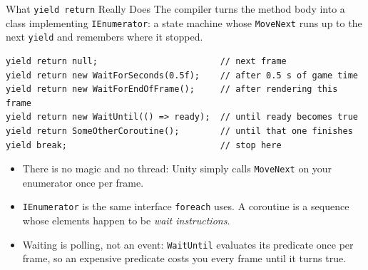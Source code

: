 \begin{frame}[fragile]{What \texttt{yield return} Really Does}
  The compiler turns the method body into a class implementing
  \texttt{IEnumerator}: a state machine whose \texttt{MoveNext} runs up to the
  next \texttt{yield} and remembers where it stopped.
  \vspace{1ex}

  \begin{lstlisting}[basicstyle=\scriptsize\ttfamily]
yield return null;                        // next frame
yield return new WaitForSeconds(0.5f);    // after 0.5 s of game time
yield return new WaitForEndOfFrame();     // after rendering this frame
yield return new WaitUntil(() => ready);  // until ready becomes true
yield return SomeOtherCoroutine();        // until that one finishes
yield break;                              // stop here
  \end{lstlisting}
  \vspace{1ex}

  \begin{itemize}
    \item There is no magic and no thread: Unity simply calls
      \texttt{MoveNext} on your enumerator once per frame.
    \item \texttt{IEnumerator} is the same interface \texttt{foreach} uses. A
      coroutine is a sequence whose elements happen to be
      \emph{wait instructions}.
    \item Waiting is polling, not an event: \texttt{WaitUntil} evaluates its
      predicate once per frame, so an expensive predicate costs you every
      frame until it turns true.
  \end{itemize}
\end{frame}

